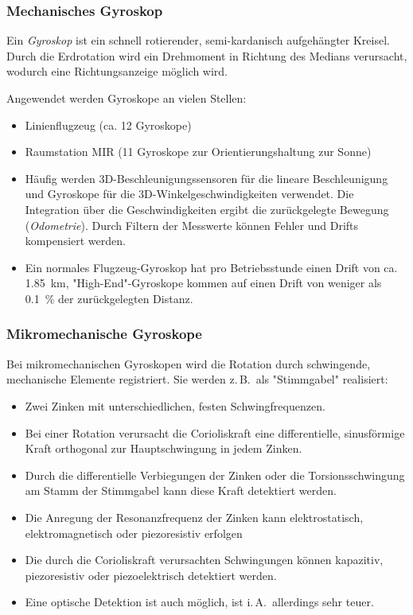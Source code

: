 \documentclass[a4paper, 11pt, accentcolor = tud3b]{tudreport}
\newcommand{\zB}{z.\,B.~}
\newcommand{\iA}{i.\,A.~}
\begin{document}
				\subsubsection{Mechanisches Gyroskop}
					Ein \emph{Gyroskop} ist ein schnell rotierender, semi-kardanisch aufgehängter Kreisel. Durch die Erdrotation wird ein Drehmoment in Richtung des Medians verursacht, wodurch eine Richtungsanzeige möglich wird.
					
					Angewendet werden Gyroskope an vielen Stellen:
					\begin{itemize}
						\item Linienflugzeug (ca. \num{12} Gyroskope)
						\item Raumstation MIR (\num{11} Gyroskope zur Orientierungshaltung zur Sonne)
						\item Häufig werden 3D-Beschleunigungssensoren für die lineare Beschleunigung und Gyroskope für die 3D-Winkelgeschwindigkeiten verwendet. Die Integration über die Geschwindigkeiten ergibt die zurückgelegte Bewegung (\emph{Odometrie}). Durch Filtern der Messwerte können Fehler und Drifts kompensiert werden.
						\item Ein normales Flugzeug-Gyroskop hat pro Betriebsstunde einen Drift von ca. \SI{1.85}{\kilo\meter}, "High-End"-Gyroskope kommen auf einen Drift von weniger als \SI{0.1}{\percent} der zurückgelegten Distanz.
					\end{itemize}

				\subsubsection{Mikromechanische Gyroskope}
					Bei mikromechanischen Gyroskopen wird die Rotation durch schwingende, mechanische Elemente registriert. Sie werden \zB als "Stimmgabel" realisiert:
					\begin{itemize}
						\item Zwei Zinken mit unterschiedlichen, festen Schwingfrequenzen.
						\item Bei einer Rotation verursacht die Corioliskraft eine differentielle, sinusförmige Kraft orthogonal zur Hauptschwingung in jedem Zinken.
						\item Durch die differentielle Verbiegungen der Zinken oder die Torsionsschwingung am Stamm der Stimmgabel kann diese Kraft detektiert werden.
						\item Die Anregung der Resonanzfrequenz der Zinken kann elektrostatisch, elektromagnetisch oder piezoresistiv erfolgen
						\item Die durch die Corioliskraft verursachten Schwingungen können kapazitiv, piezoresistiv oder piezoelektrisch detektiert werden.
						\item Eine optische Detektion ist auch möglich, ist \iA allerdings sehr teuer.
					\end{itemize}
\end{document}
